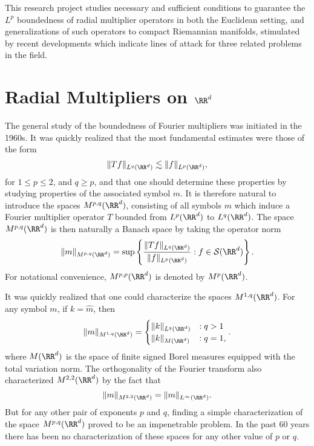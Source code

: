 This research project studies necessary and sufficient conditions to guarantee the $L^p$ boundedness of radial multiplier operators in both the Euclidean setting, and generalizations of such operators to compact Riemannian manifolds, stimulated by recent developments which indicate lines of attack for three related problems in the field.

\section{Radial Multipliers on $\RR^d$}

The general study of the boundedness of Fourier multipliers was initiated in the 1960s. It was quickly realized that the most fundamental estimates were those of the form
%
\[ \| Tf \|_{L^q(\RR^d)} \lesssim \| f \|_{L^p(\RR^d)}, \]
%
for $1 \leq p \leq 2$, and $q \geq p$, and that one should determine these properties by studying properties of the associated symbol $m$. It is therefore natural to introduce the spaces $M^{p,q}(\RR^d)$, consisting of all symbols $m$ which induce a Fourier multiplier operator $T$ bounded from $L^p(\RR^d)$ to $L^q(\RR^d)$. The space $M^{p,q}(\RR^d)$ is then naturally a Banach space by taking the operator norm
%
\[ \| m \|_{M^{p,q}(\RR^d)} = \sup \left\{ \frac{\| T f \|_{L^q(\RR^d)}}{\| f \|_{L^p(\RR^d)}} : f \in \mathcal{S}(\RR^d) \right\}. \]
%
For notational convenience, $M^{p,p}(\RR^d)$ is denoted by $M^p(\RR^d)$.

It was quickly realized that one could characterize the spaces $M^{1,q}(\RR^d)$. For any symbol $m$, if $k = \widehat{m}$, then
%
\[ \| m \|_{M^{1,q}(\RR^d)} = \begin{cases} \| k \|_{L^q(\RR^d)} &: q > 1 \\ \| k \|_{M(\RR^d)} &: q = 1, \end{cases}. \]
%
where $M(\RR^d)$ is the space of finite signed Borel measures equipped with the total variation norm. The orthogonality of the Fourier transform also characterized $M^{2,2}(\RR^d)$ by the fact that
%
\[ \| m \|_{M^{2,2}(\RR^d)} = \| m \|_{L^\infty(\RR^d)}. \]
%
But for any other pair of exponents $p$ and $q$, finding a simple characterization of the space $M^{p,q}(\RR^d)$ proved to be an impenetrable problem. In the past 60 years there has been no characterization of these spaces for any other value of $p$ or $q$.


